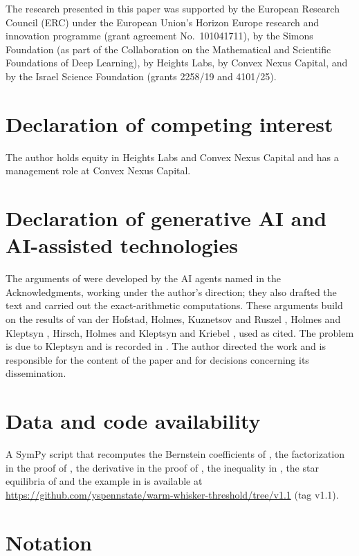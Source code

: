 \documentclass[11pt]{article}
\theoremstyle{definition}
\theoremstyle{remark}
\begin{document}
The research presented in this paper was supported by the European Research Council (ERC) under the European
Union's Horizon Europe research and innovation programme (grant agreement No.\ 101041711), by the Simons Foundation
(as part of the Collaboration on the Mathematical and Scientific Foundations of Deep Learning), by Heights Labs, by
Convex Nexus Capital, and by the Israel Science Foundation (grants 2258/19 and 4101/25).

\section*{Declaration of competing interest}

The author holds equity in Heights Labs and Convex Nexus Capital and has a management role at Convex Nexus Capital.

\section*{Declaration of generative AI and AI-assisted technologies}

The arguments of  were developed by the AI agents named in the Acknowledgments, working under
the author's direction; they also drafted the text and carried out the exact-arithmetic computations. These arguments build on the results of van der Hofstad, Holmes, Kuznetsov and Ruszel \cite{vdHHKR}, Holmes and
Kleptsyn \cite{HK}, Hirsch, Holmes and Kleptsyn \cite{HHK} and Kriebel \cite{Kr}, used as cited. The problem is due to Kleptsyn \cite{Kl} and is recorded in \cite{AOP}. The author directed
the work and is responsible for the content of the paper and for decisions concerning its dissemination.

\section*{Data and code availability}

A SymPy script that recomputes the Bernstein coefficients of , the factorization in the proof of
, the derivative in the proof of , the inequality in , the star
equilibria of  and the example in  is available at
\url{https://github.com/yspennstate/warm-whisker-threshold/tree/v1.1} (tag v1.1).

\appendix
\section{Notation}
\end{document}
